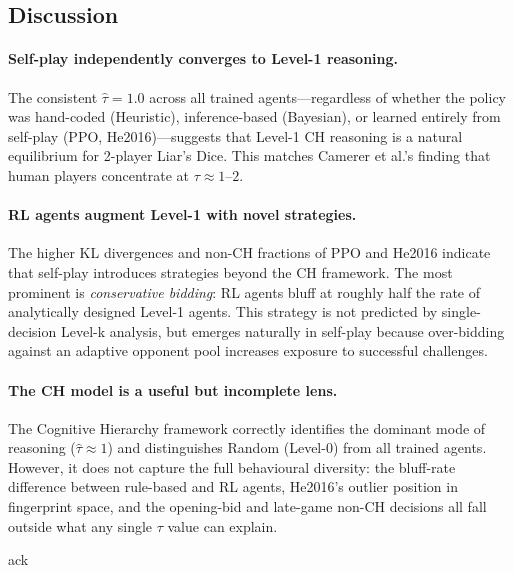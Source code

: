 \documentclass{article}
\begin{document}
\subsection{Discussion}

\paragraph{Self-play independently converges to Level-1 reasoning.}
The consistent $\hat{\tau} = 1.0$ across all trained agents---regardless of whether the policy
was hand-coded (Heuristic), inference-based (Bayesian), or learned entirely from self-play
(PPO, He2016)---suggests that Level-1 CH reasoning is a natural equilibrium for 2-player
Liar's Dice.  This matches Camerer et al.'s finding that human players concentrate at
$\tau \approx 1$--$2$.

\paragraph{RL agents augment Level-1 with novel strategies.}
The higher KL divergences and non-CH fractions of PPO and He2016 indicate that self-play
introduces strategies beyond the CH framework.  The most prominent is \emph{conservative
bidding}: RL agents bluff at roughly half the rate of analytically designed Level-1 agents.
This strategy is not predicted by single-decision Level-k analysis, but emerges naturally
in self-play because over-bidding against an adaptive opponent pool increases exposure to
successful challenges.

\paragraph{The CH model is a useful but incomplete lens.}
The Cognitive Hierarchy framework correctly identifies the dominant mode of reasoning
($\hat{\tau} \approx 1$) and distinguishes Random (Level-0) from all trained agents.  However,
it does not capture the full behavioural diversity: the bluff-rate difference between
rule-based and RL agents, He2016's outlier position in fingerprint space, and the
opening-bid and late-game non-CH decisions all fall outside what any single $\tau$ value
can explain.

\begin{ack}
ack
\end{ack}



\end{document}
